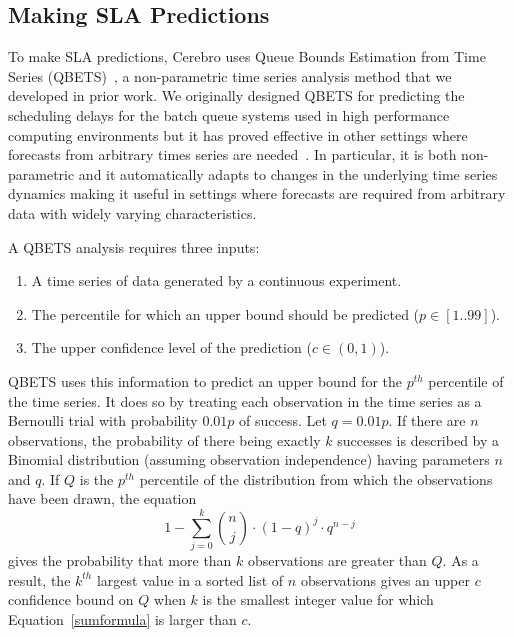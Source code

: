 \subsection{Making SLA Predictions}
\label{sec:qbets}
To make SLA predictions, Cerebro uses 
Queue Bounds Estimation from Time Series (QBETS)~\cite{Nurmi:2007:QQB:1791551.1791556},
a non-parametric time series analysis method that we developed in prior work.
We originally designed QBETS for
predicting the scheduling delays for the batch queue systems 
used in high performance computing environments but it has proved effective
in other settings where forecasts from arbitrary times series are
needed~\cite{uptime-bootstrap,quant-est,euca-power-tr-14}.  In 
particular, it is both
non-parametric and it automatically
adapts to changes in the underlying time series dynamics making it useful in
settings where forecasts are required from arbitrary data with widely varying
characteristics. 

A QBETS analysis requires three inputs:
\begin{enumerate}
\item A time series of data generated by a continuous experiment.
\item The percentile for which an upper bound should be predicted ($p \in [1..99]$).
\item The upper confidence level of the prediction ($c \in (0,1)$).
\end{enumerate}

QBETS uses this information to predict an upper bound for 
the $p^{th}$ percentile of the time series.  It does so by treating each
observation in the time series as a Bernoulli trial with probability $0.01p$ of success.  Let $q
= 0.01p$.  If there are $n$ observations, the probability of there being
exactly $k$ successes is described by a Binomial distribution (assuming
observation independence)
having parameters $n$ and $q$.  If $Q$ is the $p^{th}$ percentile of the
distribution from which the observations have been drawn, the equation 
\vspace{-0.1in}
\begin{equation}\label{sumformula}
1 - \sum_{j=0}^k { n \choose j } \cdot (1-q)^{j} \cdot q^{n-j}
\end{equation}
gives the probability that more than $k$ observations are greater than $Q$.
As a result, the $k^{th}$ largest value in a sorted list of $n$ observations
gives an upper $c$ confidence bound on $Q$ when $k$ is the smallest integer
value for which Equation~\ref{sumformula} is larger than $c$.

